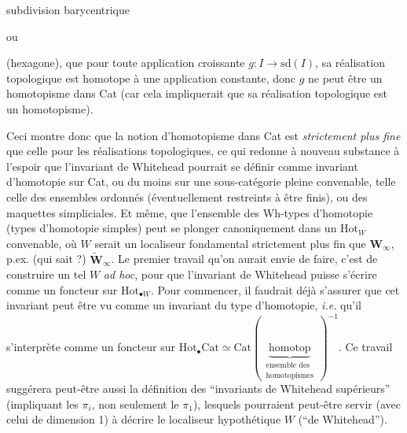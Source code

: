 subdivision barycentrique

\begin{center}
\qquad\qquad\qquad ou \qquad\qquad\qquad
{}
\end{center}

(hexagone), que pour toute application croissante $g : I \longrightarrow \mathrm{sd}(I)$, sa réalisation topologique est homotope à une application constante, donc $g$ ne peut être un homotopisme dans Cat (car cela impliquerait que sa réalisation topologique est un homotopisme).

Ceci montre donc que la notion d'homotopisme dans Cat est \textit{strictement plus fine} que celle pour les réalisations topologiques, ce qui redonne à nouveau substance à l'espoir que l'invariant de Whitehead pourrait se définir comme invariant d'homotopie sur Cat, ou du moins sur une sous-catégorie pleine convenable, telle celle des ensembles ordonnés (éventuellement restreints à être finis), ou des maquettes simpliciales. Et même, que l'ensemble des Wh-types d'homotopie (types d'homotopie simples) peut se
plonger canoniquement dans un $\mathrm{Hot}_W$ convenable, où $W$ serait un localiseur fondamental strictement plus fin que $\mathbf{W}_\infty$, p.ex. (qui sait ?) $\tilde{\mathbf{W}}_\infty$. Le premier travail qu'on aurait envie de faire, c'est de construire un tel $W$ \textit{ad hoc}, pour que l'invariant de Whitehead puisse s'écrire comme un foncteur sur $\mathrm{Hot}_{\bullet W}$. Pour commencer, il faudrait déjà s'assurer que cet invariant peut être vu comme un invariant du type d'homotopie, \textit{i.e.} qu'il s'interprète comme un foncteur sur $\mathrm{Hot}_{\bullet}\mathrm{Cat} \simeq \mathrm{Cat}(\,\underbrace{\text{homotop}}_{\substack{\text{ensemble des}\\ \text{homotopismes}}}\,)^{-1}$. Ce travail suggérera peut-être aussi la définition des “invariants de Whitehead supérieurs” (impliquant les $\pi_i$, non seulement le $\pi_1$), lesquels pourraient peut-être servir (avec celui de dimension 1) à décrire le localiseur hypothétique $W$ (“de Whitehead”).

